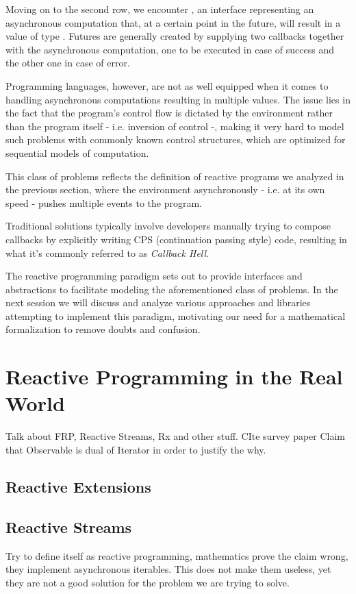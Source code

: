 Moving on to the second row, we encounter , an interface representing an asynchronous computation that, at a certain point in the future, will result in a value of type . Futures are generally created by supplying two callbacks together with the asynchronous computation, one to be executed in case of success and the other one in case of error. 

Programming languages, however, are not as well equipped when it comes to handling asynchronous computations resulting in multiple values. The issue lies in the fact that the program's control flow is dictated by the environment rather than the program itself - i.e. inversion of control -, making it very hard to model such problems with commonly known control structures, which are optimized for sequential models of computation.

This class of problems reflects the definition of reactive programs we analyzed in the previous section, where the environment asynchronously - i.e. at its own speed - pushes multiple events to the program. 

Traditional solutions typically involve developers manually trying to compose callbacks by explicitly writing CPS (continuation passing style) code\cite{meijer2015spicing}, resulting in what it's commonly referred to as \textit{Callback Hell}\cite{edwards2009coherent}.

The reactive programming paradigm sets out to provide interfaces and abstractions to facilitate modeling the aforementioned class of problems. In the next session we will discuss and analyze various approaches and libraries attempting to implement this paradigm, motivating our need for a mathematical formalization to remove doubts and confusion. 


\section{Reactive Programming in the Real World}

Talk about FRP, Reactive Streams, Rx and other stuff. CIte survey paper
Claim that Observable is dual of Iterator in order to justify the why.

\subsection{Reactive Extensions}
\label{subsec:rx}

\subsection{Reactive Streams}
Try to define itself as reactive programming, mathematics prove the claim wrong, they implement asynchronous iterables. This does not make them useless, yet they are not a good solution for the problem we are trying to solve.

